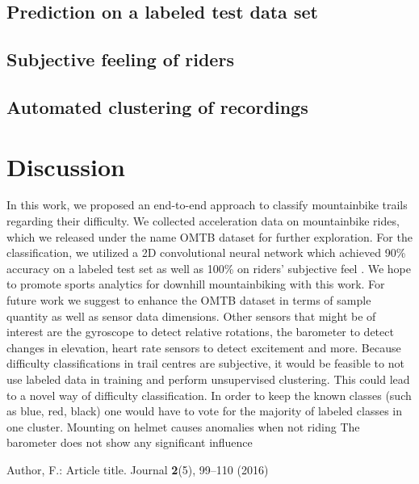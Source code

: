 \documentclass[runningheads]{llncs}
\begin{document}
\subsection{Prediction on a labeled test data set}

\subsection{Subjective feeling of riders}

\subsection{Automated clustering of recordings}

\section{Discussion}

In this work, we proposed an end-to-end approach to classify mountainbike trails regarding their difficulty. 
We collected acceleration data on mountainbike rides, which we released under the name OMTB dataset for further exploration.
For the classification, we utilized a 2D convolutional neural network which achieved 90\% accuracy on a labeled test set as well as 100\% on riders' subjective feel \cite{ref_article1,ref_lncs1,ref_book1}.
We hope to promote sports analytics for downhill mountainbiking with this work.
For future work we suggest to enhance the OMTB dataset in terms of sample quantity as well as sensor data dimensions. 
Other sensors that might be of interest are the gyroscope to detect relative rotations, the barometer to detect changes in elevation, heart rate sensors to detect excitement and more.
Because difficulty classifications in trail centres are subjective, it would be feasible to not use labeled data in training and perform  unsupervised clustering.
This could lead to a novel way of difficulty classification. 
In order to keep the known classes (such as blue, red, black) one would have to vote for the majority of labeled classes in one cluster.
Mounting on helmet causes anomalies when not riding
The barometer does not show any significant influence



%
%
%
% 
% 
%
%
\begin{thebibliography}{8}
Author, F.: Article title. Journal \textbf{2}(5), 99--110 (2016)


\end{thebibliography}
\end{document}
